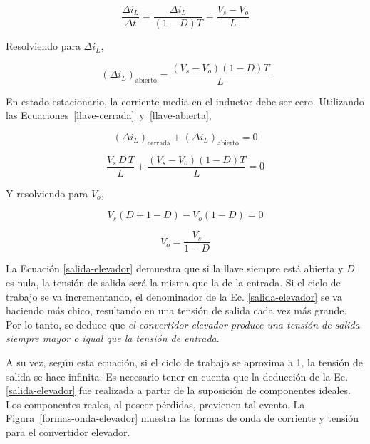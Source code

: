 \begin{equation*}
    \frac{\Delta i_L}{\Delta t} = \frac{\Delta i_L}{(1-D) T} = \frac{V_s - V_o}{L}
\end{equation*}

Resolviendo para $\Delta i_L$,

\begin{equation}
    \boxed{(\Delta i_L)_{\mathrm{abierto}} = \frac{(V_s - V_o)(1-D)T}{L}}
    \label{llave-abierta}
\end{equation}

En estado estacionario, la corriente media en el inductor debe ser cero. Utilizando las Ecuaciones~\ref{llave-cerrada}~y~\ref{llave-abierta}, 

\begin{equation*}
    \boxed{(\Delta i_L)_{\mathrm{cerrada}} + (\Delta i_L)_{\mathrm{abierto}} = 0}
\end{equation*}

\begin{equation*}
    \frac{V_s \, D \, T}{L} + \frac{(V_s - V_o)(1-D)T}{L} = 0
\end{equation*}

Y resolviendo para $V_o$,

\begin{equation*}
    V_s (D + 1 - D) - V_o (1 - D) = 0
\end{equation*}

\begin{equation}
    \boxed{V_o = \frac{V_s}{1-D}}
    \label{salida-elevador}
\end{equation}

La Ecuación \ref{salida-elevador} demuestra que si la llave siempre está abierta y $D$ es nula, la tensión de salida será la misma que la de la entrada. Si el ciclo de trabajo se va incrementando, el denominador de la Ec. \ref{salida-elevador} se va haciendo más chico, resultando en una tensión de salida cada vez más grande. Por lo tanto, se deduce que \emph{el convertidor elevador produce una tensión de salida siempre mayor o igual que la tensión de entrada}.

A su vez, según esta ecuación, si el ciclo de trabajo se aproxima a 1, la tensión de salida se hace infinita. Es necesario tener en cuenta que la deducción de la Ec. \ref{salida-elevador} fue realizada a partir de la suposición de componentes ideales. Los componentes reales, al poseer pérdidas, previenen tal evento. La Figura~\ref{formas-onda-elevador} muestra las formas de onda de corriente y tensión para el convertidor elevador.

